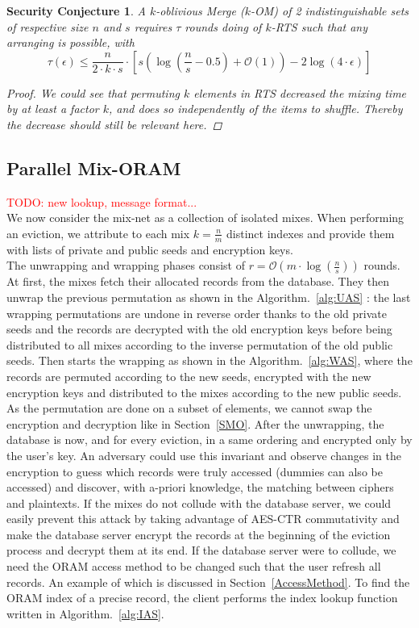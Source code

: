 \documentclass{llncs}
\newtheorem{seccjt}{Security Conjecture}
\newcommand{\todo}[1]{\textcolor{red}{TODO: #1}}
\begin{document}
\begin{seccjt}
A $k$-oblivious Merge ($k$-OM) of 2 indistinguishable sets of respective size $n$ and $s$ requires $\tau$ rounds doing of $k$-RTS such that any arranging is possible, with
$$ \tau(\epsilon) \leq \frac{n}{2\cdot k \cdot s}  \cdot \left [ s \left( \log \left (\frac{n}{s}-0.5\right) +\mathcal{O}\left(1\right) \right ) - 2\log \left( 4 \cdot \epsilon\right) \right ] $$
\begin{proof}
We could see that permuting $k$ elements in RTS decreased the mixing time by at least a factor $k$, and does so independently of the items to shuffle. Thereby the decrease should still be relevant here.
\end{proof}
\end{seccjt}
%
\subsection{Parallel Mix-ORAM}\label{parallelMixORAM}
\todo{new lookup, message format... \\}
%
We now consider the mix-net as a collection of isolated mixes. When performing an eviction, we attribute to each mix  $k=\frac{n}{m}$ distinct indexes and provide them with lists of private and public seeds and encryption keys.\\
The unwrapping and wrapping phases consist of $r=\mathcal{O}\left ( m \cdot \log \left (\frac{n}{s} \right ) \right )$ rounds.
At first, the mixes fetch their allocated records from the database. They then unwrap the previous permutation as shown in the Algorithm.~\ref{alg:UAS} : the last wrapping permutations are undone in reverse order thanks to the old private seeds and the records are decrypted with the old encryption keys before being distributed to all mixes according to the inverse permutation of the old public seeds. Then starts the wrapping as shown in the Algorithm.~\ref{alg:WAS}, where the records are permuted according to the new seeds, encrypted with the new encryption keys and distributed to the mixes according to the new public seeds.\\

As the permutation are done on a subset of elements, we cannot swap the encryption and decryption like in Section~\ref{SMO}. After the unwrapping, the database is now, and for every eviction, in a same ordering and encrypted only by the user's key. An adversary could use this invariant and observe changes in the encryption to guess which records were truly accessed (dummies can also be accessed) and discover, with a-priori knowledge, the matching between ciphers and plaintexts. 
If the mixes do not collude with the database server, we could easily prevent this attack by taking advantage of AES-CTR commutativity and make the database server encrypt the records at the beginning of the eviction process and decrypt them at its end. 
If the database server were to collude, we need the ORAM access method to be changed such that the user refresh all records. An example of which is discussed in Section~\ref{AccessMethod}.
To find the ORAM index of a precise record, the client performs the index lookup function written in Algorithm.~\ref{alg:IAS}.\\
\end{document}
